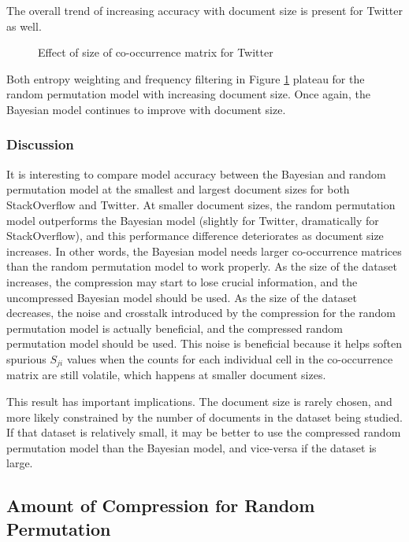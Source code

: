 \documentclass[man,floatsintext,donotrepeattitle]{apa6}
\begin{document}
The overall trend of increasing accuracy with document size is present for Twitter as well.

\begin{figure}[!htbp]
  \caption{Effect of size of co-occurrence matrix for Twitter}
  \label{figContextDocumentSizeT}
\end{figure}

Both entropy weighting and frequency filtering in Figure \ref{figContextDocumentSizeT} plateau for the random permutation model with increasing document size.
Once again, the Bayesian model continues to improve with document size.

\subsubsection{Discussion}

It is interesting to compare model accuracy between the Bayesian and random permutation model at the smallest and largest document sizes for both StackOverflow and Twitter.
At smaller document sizes, the random permutation model outperforms the Bayesian model (slightly for Twitter, dramatically for StackOverflow), and this performance difference deteriorates as document size increases.
In other words, the Bayesian model needs larger co-occurrence matrices than the random permutation model to work properly.
As the size of the dataset increases, the compression may start to lose crucial information, and the uncompressed Bayesian model should be used.
As the size of the dataset decreases, the noise and crosstalk introduced by the compression for the random permutation model is actually beneficial, and the compressed random permutation model should be used. 
This noise is beneficial because it helps soften spurious $S_{ji}$ values when the counts for each individual cell in the co-occurrence matrix are still volatile, which happens at smaller document sizes.

This result has important implications.
The document size is rarely chosen, and more likely constrained by the number of documents in the dataset being studied.
If that dataset is relatively small, it may be better to use the compressed random permutation model than the Bayesian model, and vice-versa if the dataset is large.

\subsection{Amount of Compression for Random Permutation}
\end{document}
